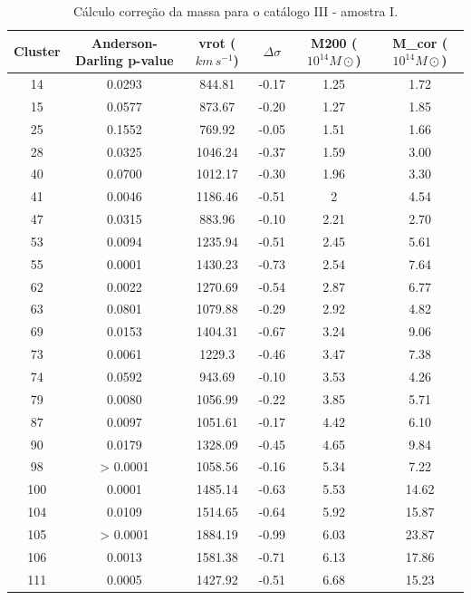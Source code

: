 {\scriptsize
\begin{longtable}{cccccc}
\caption{Cálculo correção da massa para o catálogo III - amostra I.}
\label{tab:massamostrai}
\\ \hline
\textbf{Cluster} & \textbf{Anderson-Darling p-value} &  \textbf{vrot ($km \, s^{-1}$)} & \textbf{$\Delta \sigma$} &\textbf{M200 ($10^{14}  M\odot$)} & \textbf{M_{cor} ($10^{14}  M\odot$)}\\ \hline
14 & {\color{red}0.0293} & 844.81 & -0.17 & 1.25 & 1.72 \\
15 & 0.0577 & 873.67 & -0.20 & 1.27 & 1.85 \\
25 & 0.1552 & 769.92 & -0.05 & 1.51 & 1.66 \\
28 & {\color{red}0.0325} & 1046.24 & -0.37 & 1.59 & 3.00 \\
40 & 0.0700 & 1012.17 & -0.30 & 1.96 & 3.30 \\
41 & {\color{red}0.0046} & 1186.46 & -0.51 & 2 & 4.54 \\
47 & {\color{red}0.0315} & 883.96 & -0.10 & 2.21 & 2.70 \\
53 & {\color{red}0.0094} & 1235.94 & -0.51 & 2.45 & 5.61 \\
55 & {\color{red}0.0001} & 1430.23 & -0.73 & 2.54 & 7.64 \\
62 & {\color{red}0.0022} & 1270.69 & -0.54 & 2.87 & 6.77 \\
63 & 0.0801 & 1079.88 & -0.29 & 2.92 & 4.82 \\
69 & {\color{red}0.0153} & 1404.31 & -0.67 & 3.24 & 9.06 \\
73 & {\color{red}0.0061} & 1229.3 & -0.46 & 3.47 & 7.38 \\
74 & 0.0592 & 943.69 & -0.10 & 3.53 & 4.26 \\
79 & {\color{red}0.0080} & 1056.99 & -0.22 & 3.85 & 5.71 \\
87 & {\color{red}0.0097} & 1051.61 & -0.17 & 4.42 & 6.10 \\
90 & {\color{red}0.0179} & 1328.09 & -0.45 & 4.65 & 9.84 \\
98 & {\color{red}> 0.0001} & 1058.56 & -0.16 & 5.34 & 7.22 \\
100 & {\color{red}0.0001} & 1485.14 & -0.63 & 5.53 & 14.62 \\
104 & {\color{red}0.0109} & 1514.65 & -0.64 & 5.92 & 15.87 \\
105 & {\color{red}> 0.0001} & 1884.19 & -0.99 & 6.03 & 23.87 \\
106 & {\color{red}0.0013} & 1581.38 & -0.71 & 6.13 & 17.86 \\
111 & {\color{red}0.0005} & 1427.92 & -0.51 & 6.68 & 15.23 \\

\end{longtable}}
